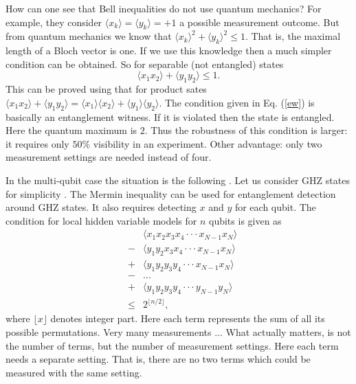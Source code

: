 \documentclass[pra,amsmath,amssymb]{revtex4}
\def\be{\begin{equation}}
\def\ee{\end{equation}}
\def\eea{\end{eqnarray}}
\def\bea{\begin{eqnarray}}
\newcommand{\exs}[1]{\ensuremath{\langle{#1}\rangle}}
\begin{document}
How can one see that Bell inequalities do not use quantum
mechanics? For example, they consider $\exs{x_k}=\exs{y_k}=+1$ a possible
measurement outcome. But from quantum mechanics we know that
$\exs{x_k}^2+\exs{y_k}^2\le 1$. That is, the maximal length of 
a Bloch vector is one.
If we use this knowledge then a much
simpler condition can be obtained. So for separable (not entangled)
states \be \exs{x_1x_2}+\exs{y_1y_2}\le 1.\label{ew}\ee 
This can be proved using that for product sates
$\exs{x_1x_2}+\exs{y_1y_2}=
\exs{x_1}\exs{x_2}+\exs{y_1}\exs{y_2}$.
The condition given in Eq. (\ref{ew}) is basically an
entanglement witness. If it is violated then the state is entangled.
Here the quantum maximum is $2$. Thus the
robustness of this condition is larger: it requires only
$50\%$ visibility in an experiment. Other advantage: only two
measurement settings are needed instead of four.

In the multi-qubit case the situation is the following \cite{GB98}. Let us
consider GHZ states for simplicity \cite{GH90}. 
The Mermin inequality \cite{M90} can be
used for entanglement detection around GHZ states. It also
requires detecting $x$ and $y$ for each qubit. The condition for
local hidden variable models for $n$ qubits is given as \bea
&&\exs{x_1x_2x_3x_4 \cdot \cdot \cdot
x_{N-1}x_{N}}\nonumber\\
&-&\exs{ y_{1}y_{2}x_{3}x_{4} \cdot \cdot \cdot x_{N-1}x_{N}}\nonumber\\
&+&\exs{y_{1}y_{2}y_{3}y_{4}\cdot \cdot \cdot x_{N-1}x_{N}}\nonumber\\
&-& ... \nonumber\\
&+&\exs{ y_{1}y_{2}y_{3}y_{4} \cdot \cdot \cdot
y_{N-1}y_{N}}\nonumber\\&\le& 2^{\lfloor n/2\rfloor},\eea where
$\lfloor x\rfloor$ denotes integer part. Here each term represents
the sum of all its possible permutations. Very many measurements
... What actually matters, is not the number of terms, but the
number of measurement settings. Here each term needs a separate
setting. That is, there are no two terms which could be measured
with the same setting.

\end{document}
